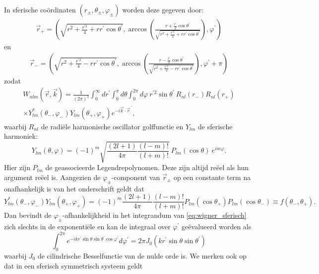 \documentclass[11pt,twoside]{book}
\begin{document}
In sferische co\"{o}rdinaten $(r_\pm,\theta_\pm,\varphi_\pm)$ worden deze gegeven door:
\begin{align*}
\vec{r}_+ = (\sqrt{r^2+ \frac{r^{\prime 2}}{4} + r r^\prime \cos{\theta^\prime}}, \arccos \left(\frac{r + \frac{r^\prime}{2}\cos \theta^\prime}{\sqrt{r^2+ \frac{r^{\prime 2}}{4} + r r^\prime \cos{\theta^\prime} }} \right),\varphi^\prime) 
\end{align*}
en
\begin{align*}
\vec{r}_- = (\sqrt{r^2+ \frac{r^{\prime 2}}{4} - r r^\prime  \cos{\theta^\prime}}, \arccos \left(\frac{r -\frac{r^\prime}{2}\cos \theta^\prime}{\sqrt{r^2+ \frac{r^{\prime 2}}{4} - r r^\prime \cos{\theta^\prime} }} \right),\varphi^\prime+ \pi) 
\end{align*}
zodat
\begin{align} \label{eq:wigner_sferisch}
W_{nlm}(\vec{r},\vec{k}) = \frac{1}{(2\pi)^3} \int^\infty_0 dr^\prime \int^\pi_0 d\theta \int^{2\pi}_0 d\varphi\    r^{\prime 2} \sin \theta^\prime \ R_{nl}(r_-) R_{nl}(r_+) \nonumber \\ \times Y^*_{lm}(\theta_-,\varphi_-)  Y_{lm}(\theta_+,\varphi_+) e^{-i\vec{k}\cdot \vec{r}^{\ \prime}},
\end{align}
waarbij $R_{nl}$ de radi\"{e}le harmonische oscillator golffunctie en $Y_{lm}$ de sferische harmoniek:
\begin{equation}
Y_{lm}(\theta,\varphi) = (-1)^m \sqrt{\frac{(2l+1)}{4\pi}\frac{(l-m)!}{(l+m)!}}\  P_{lm}(\cos \theta) \ e^{im\varphi}.
\end{equation}
Hier zijn $P_{lm}$ de geassocieerde Legendrepolynomen. Deze zijn altijd re\"{e}el als hun argument re\"{e}el is.
Aangezien de $\varphi_\pm$-component van $\vec{r}_\pm$ op een constante term na onafhankelijk is van het onderschrift geldt dat
\begin{equation}
Y^*_{lm}(\theta_-,\varphi_-)  Y_{lm}(\theta_+,\varphi_+) = (-1)^m \frac{(2l+1)}{4\pi}\frac{(l-m)!}{(l+m)!}  P_{lm}(\cos \theta_+)  P_{lm}(\cos \theta_-) \equiv f(\theta_-,\theta_+).
\end{equation}
Dan bevindt de $\varphi_\pm$-afhankelijkheid in het integrandum van \eqref{eq:wigner_sferisch} zich slechts in de exponenti\"{e}le en kan de integraal over $\varphi^\prime$ ge\"{e}valueerd worden als
\begin{equation}
\int^{2\pi}_0  e^{-ikr^\prime \sin \theta \sin \theta^\prime \cos \varphi^\prime } d\varphi^\prime = 2\pi J_0(kr^\prime \sin \theta \sin \theta^\prime)
\end{equation}
waarbij $J_0$ de cilindrische Besselfunctie van de nulde orde is. We merken ook op dat in een sferisch symmetrisch systeem geldt
\end{document}
